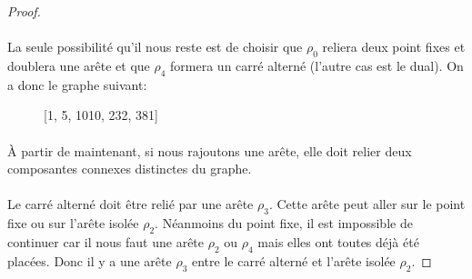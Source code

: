 \begin{proof}
\paragraph{}
La seule possibilité qu'il nous reste est de choisir que $\rho_0$ reliera deux point fixes et doublera une arête et que $\rho_4$ formera un carré alterné (l'autre cas est le dual). On a donc le graphe suivant:


\begin{figure}[H]
  \begin{center}
    \caption{[1, 5, 1010, 232, 381]}
  \end{center}
\end{figure}

\paragraph{}
À partir de maintenant, si nous rajoutons une arête, elle doit relier deux composantes connexes distinctes du graphe.

\paragraph{}
Le carré alterné doit être relié par une arête $\rho_3$. Cette arête peut aller sur le point fixe ou sur l'arête isolée $\rho_2$. Néanmoins du point fixe, il est impossible de continuer car il nous faut une arête $\rho_2$ ou $\rho_4$ mais elles ont toutes déjà été placées. Donc il y a une arête $\rho_3$ entre le carré alterné et l'arête isolée $\rho_2$.


\end{proof}
